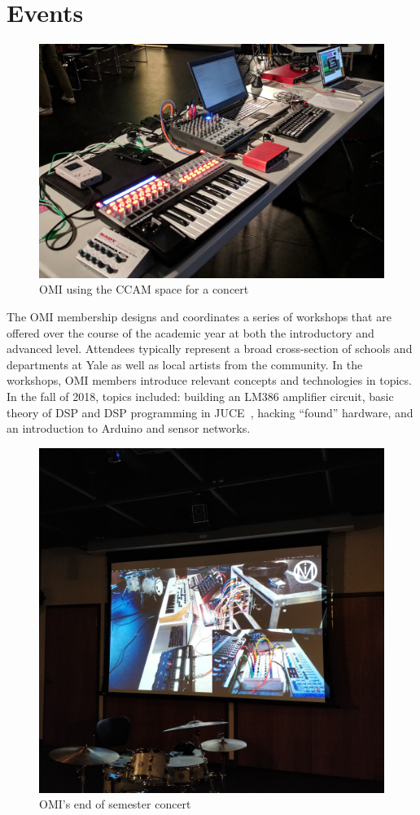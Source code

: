 \section{Events}

\begin{figure}[!h]
    \centering
    \includegraphics[width=0.85\columnwidth]{figs/concert.jpg}
    \caption{OMI using the CCAM space for a concert}
    \label{fig:concert}
\end{figure}

The OMI membership designs and coordinates a series of workshops that are offered over the course of the academic year at both the introductory and advanced level. Attendees typically represent a broad cross-section of schools and departments at Yale as well as local artists from the community. In the workshops, OMI members introduce relevant concepts and technologies in topics. In the fall of 2018, topics included: building an LM386 amplifier circuit, basic theory of DSP and DSP programming in JUCE~\cite{juce}, hacking ``found'' hardware, and an introduction to Arduino and sensor networks.


 
\begin{figure}
    \centering
    \includegraphics[width=0.85\columnwidth]{figs/concert2.jpg}
    \caption{OMI's end of semester concert}
    \label{fig:concert}
\end{figure}
 
